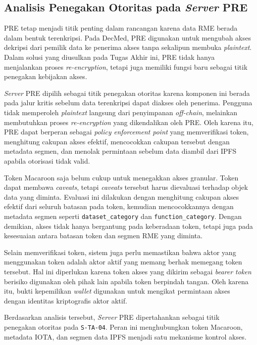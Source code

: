\subsection{Analisis Penegakan Otoritas pada \textit{Server} PRE}
\label{subsec:analisis-penegakan-otoritas-pre}

PRE tetap menjadi titik penting dalam rancangan karena data RME berada dalam bentuk terenkripsi. Pada DecMed, PRE digunakan untuk mengubah akses dekripsi dari pemilik data ke penerima akses tanpa sekalipun membuka \textit{plaintext}. Dalam solusi yang diusulkan pada Tugas Akhir ini, PRE tidak hanya menjalankan proses \textit{re-encryption}, tetapi juga memiliki fungsi baru sebagai titik penegakan kebijakan akses.

\textit{Server} PRE dipilih sebagai titik penegakan otoritas karena komponen ini berada pada jalur kritis sebelum data terenkripsi dapat diakses oleh penerima. Pengguna tidak memperoleh \textit{plaintext} langsung dari penyimpanan \textit{off-chain}, melainkan membutuhkan proses \textit{re-encryption} yang dikendalikan oleh PRE. Oleh karena itu, PRE dapat berperan sebagai \textit{policy enforcement point} yang memverifikasi token, menghitung cakupan akses efektif, mencocokkan cakupan tersebut dengan metadata segmen, dan menolak permintaan sebelum data diambil dari IPFS apabila otorisasi tidak valid.

Token Macaroon saja belum cukup untuk menegakkan akses granular. Token dapat membawa \textit{caveats}, tetapi \textit{caveats} tersebut harus dievaluasi terhadap objek data yang diminta. Evaluasi ini dilakukan dengan menghitung cakupan akses efektif dari seluruh batasan pada token, kemudian mencocokkannya dengan metadata segmen seperti \texttt{dataset\_category} dan \texttt{function\_category}. Dengan demikian, akses tidak hanya bergantung pada keberadaan token, tetapi juga pada kesesuaian antara batasan token dan segmen RME yang diminta.

Selain memverifikasi token, sistem juga perlu memastikan bahwa aktor yang menggunakan token adalah aktor aktif yang memang berhak memegang token tersebut. Hal ini diperlukan karena token akses yang dikirim sebagai \textit{bearer token} berisiko digunakan oleh pihak lain apabila token berpindah tangan. Oleh karena itu, bukti kepemilikan \textit{wallet} digunakan untuk mengikat permintaan akses dengan identitas kriptografis aktor aktif.

Berdasarkan analisis tersebut, \textit{Server} PRE dipertahankan sebagai titik penegakan otoritas pada \texttt{S-TA-04}. Peran ini menghubungkan token Macaroon, metadata IOTA, dan segmen data IPFS menjadi satu mekanisme kontrol akses.

